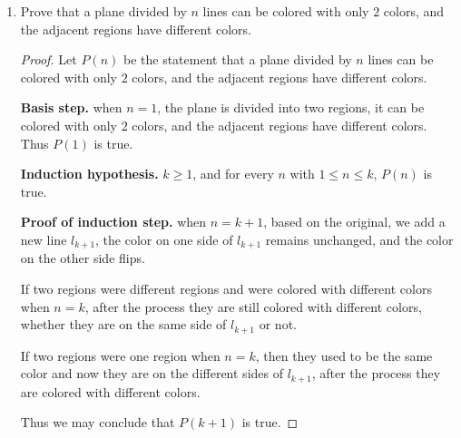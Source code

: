 \documentclass[12pt,a4paper]{article}
\theoremstyle{definition}
\begin{document}
\begin{enumerate}
\begin{proof}
        Now we have
    	\[ p_{k+1} \leq 1 + \prod_{j=1}^{k}p_{j} < 1 + \prod_{j=1}^{k}2^{2^{j}} = 1 + 2^{2^{k+1} - 2} < 2^{2^{k+1}}\]   	
    \end{proof}

    \item
    Prove that a plane divided by $n$ lines can be colored with only $2$ colors, and the adjacent regions have different colors.
    \begin{proof}
        Let $P(n)$ be the statement that a plane divided by $n$ lines can be colored with only $2$ colors, and the adjacent regions have different colors.
        
        \textbf{Basis step.} when $n = 1$, the plane is divided into two regions, it can be colored with only $2$ colors, and the adjacent regions have different colors. Thus $P(1)$ is true.
        
        \textbf{Induction hypothesis.} $k \geq 1$, and for every $n$ with $1 \leq n \leq k$, $P(n)$ is true.
        
        \textbf{Proof of induction step.} when $n = k+1$, based on the original, we add a new line $l_{k+1}$, the color on one side of $l_{k+1}$ remains unchanged, and the color on the other side flips.
        
        If two regions  were different regions and were colored with different colors when $n = k$, after the process they are still colored with different colors, whether they are on the same side of $l_{k+1}$ or not.
        
        If two regions were one region when $n = k$, then they used to be the same color and now they are on the different sides of $l_{k+1}$, after the process they are colored with different colors.
        
        Thus we may conclude that $P(k+1)$ is true.
    \end{proof}

\end{enumerate}


\end{document}
